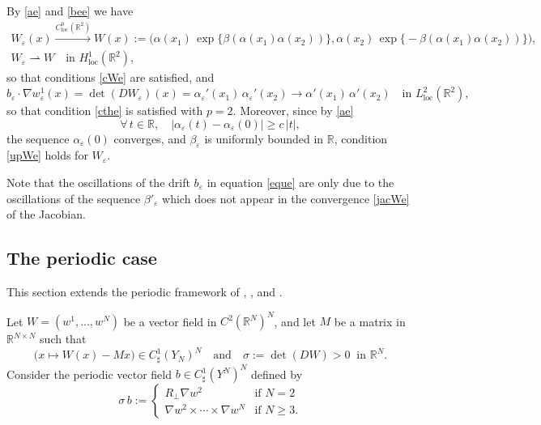 \documentclass[11pt]{article}
\newcommand{\loc}{\mathrm{loc}}
\let\al\alpha
\let \be \beta
\def \RR {\mathbb R}
\theoremstyle{plain}
\theoremstyle{definition}
\numberwithin{equation}{section}
\begin{document}
By \eqref{ae} and \eqref{bee} we have
\begin{gather*}
 W_\varepsilon(x)\xrightarrow{C^0_\loc(\RR^2)}W(x)\!:=\!\bigl(\al(x_1)\,\exp\big\{\be(\al(x_1)\al(x_2))\big\},\al(x_2)\,\exp\big\{\!-\!\be(\al(x_1)\al(x_2))\big\}\bigr),
\\
W_\varepsilon\rightharpoonup W \quad\mbox{in }H^1_\loc(\RR^2),
\end{gather*}
so that conditions \eqref{cWe} are satisfied, and
\begin{equation}\label{jacWe}
b_\varepsilon\cdot\nabla w_\varepsilon^1(x)=\det(DW_\varepsilon)(x)=\al_\varepsilon'(x_1)\,\al_\varepsilon'(x_2)\to \al'(x_1)\,\al'(x_2)\quad\mbox{in }L^2_\loc(\RR^2),
\end{equation}
so that condition \eqref{cthe} is satisfied with $p=2$.
Moreover, since by \eqref{ae}
\[
\forall\,t\in\RR,\quad |\al_\varepsilon(t)-\al_\varepsilon(0)|\geq c\,|t|,
\]
the sequence $\al_\varepsilon(0)$ converges, and $\be_\varepsilon$ is uniformly bounded in $\RR$, condition \eqref{upWe} holds for $W_\varepsilon$.

Note that the oscillations of the drift $b_\varepsilon$ in equation \eqref{eque} are only due to the oscillations of the sequence $\be'_\varepsilon$ which does not appear in the convergence \eqref{jacWe} of the Jacobian.

\subsection{The periodic case}\label{ss.per}
This section extends the periodic framework of \cite{Bre,HoXi,Tas}, \cite[Th.\,8]{Gol1}, and \cite[Cor.\,4.4]{Bri}.

Let $W=(w^1,\dots,w^N)$ be a vector field in $C^2(\RR^N)^N$, and let $M$ be a matrix in $\RR^{N\times N}$ such that
\begin{equation}\label{siW}
\big(x\mapsto W(x)-Mx\big)\in C^1_\sharp(Y_N)^N\quad\mbox{and}\quad \sigma:=\det(DW)>0\;\;\mbox{in }\RR^N.
\end{equation}
Consider the periodic vector field $b\in C^1_\sharp(Y^N)^N$ defined by
\begin{equation}\label{sib}
\sigma\,b:=\begin{cases}
R_\perp\nabla w^2 & \mbox{if }N=2
\\[3pt]
\nabla w^2\times\cdots\times \nabla w^N & \mbox{if }N\geq 3.
\end{cases}
\end{equation}
\end{document}
